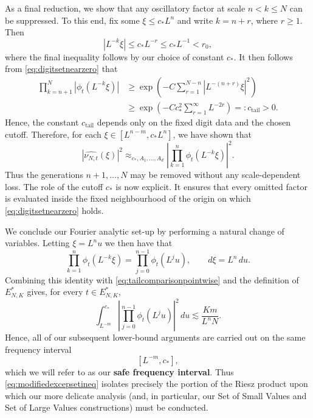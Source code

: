 \documentclass[12pt]{amsart}
\numberwithin{equation}{section}
\begin{document}
As a final reduction, we show that any oscillatory factor at scale $n < k \leq N$ can be suppressed. To this end, fix some
$
\xi\leq c_*L^n
$
and write $k=n+r$, where $r\geq1$. Then
\begin{equation}\label{eq:tailargumentsmall}
|L^{-k}\xi|
\leq c_*L^{-r}
\leq c_*L^{-1}
<r_0,
\end{equation}
where the final inequality follows by our choice of constant $c_*$. It then follows from \eqref{eq:digitsetnearzero} that
\begin{align*}
\prod_{k=n+1}^N|\phi_t(L^{-k}\xi)|
&\geq
\exp\left(
 -C\sum_{r=1}^{N-n}|L^{-(n+r)}\xi|^2
\right)\\
&\geq
\exp\left(
 -Cc_*^2\sum_{r=1}^{\infty}L^{-2r}
\right)
=:c_{\mathrm{tail}}>0.
\end{align*}
Hence, the constant $c_{\mathrm{tail}}$ depends only on the fixed digit data and the chosen cutoff.
Therefore, for each $\xi \in [L^{n-m},c_*L^n]$, we have shown that
\begin{equation}\label{eq:tailcomparisonpointwise}
\left|\widehat{\nu_{N,t}}(\xi)\right|^2
\approx_{c_*, A_1,...,A_d}
\left|
 \prod_{k=1}^n\phi_t(L^{-k}\xi)
\right|^2.
\end{equation}
Thus the generations $n+1,\ldots,N$ may be removed without any scale-dependent loss.
The role of the cutoff $c_*$ is now explicit. It ensures that every omitted factor is evaluated inside the fixed neighbourhood of the origin on which \eqref{eq:digitsetnearzero} holds.

We conclude our Fourier analytic set-up by performing a natural change of variables. Letting
$
\xi=L^nu
$
we then have that
\[
\prod_{k=1}^n\phi_t(L^{-k}\xi)
=
\prod_{j=0}^{n-1}\phi_t(L^ju),
\qquad
d\xi=L^n\,du.
\]
Combining this identity with
\eqref{eq:tailcomparisonpointwise} and the definition of
$E_{N,K}^*$ gives, for every $t\in E_{N,K}^*$,
\begin{equation}\label{eq:modifiedexcepsetineq}
\int_{L^{-m}}^{c_*}
\left|
 \prod_{j=0}^{n-1}\phi_t(L^ju)
\right|^2\,du
\lesssim
\frac{Km}{L^nN}.
\end{equation}
Hence, all of our subsequent lower-bound arguments are carried out on the same frequency interval
\[
[L^{-m},c_*],
\]
which we will refer to as our \textbf{safe frequency interval}.  Thus
\eqref{eq:modifiedexcepsetineq} isolates precisely the portion of the Riesz product upon which our more delicate analysis (and, in particular, our Set of Small Values and Set of Large Values constructions) must be conducted.
\end{document}
